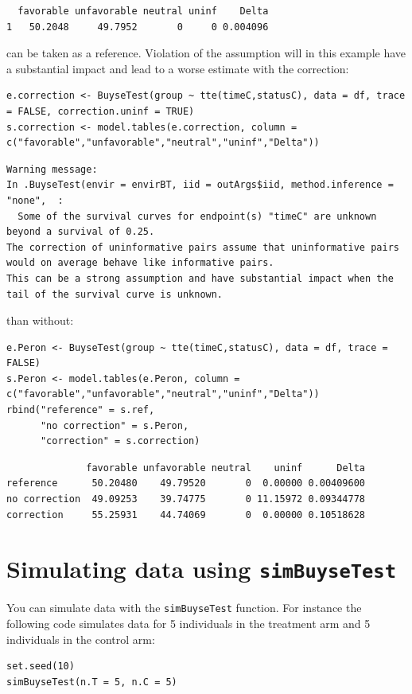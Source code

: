 \documentclass[12pt]{article}
\begin{document}
\begin{verbatim}
  favorable unfavorable neutral uninf    Delta
1   50.2048     49.7952       0     0 0.004096
\end{verbatim}


can be taken as a reference. Violation of the assumption will in this
example have a substantial impact and lead to a worse estimate with
the correction:
\lstset{language=r,label= ,caption= ,captionpos=b,numbers=none}
\begin{lstlisting}
e.correction <- BuyseTest(group ~ tte(timeC,statusC), data = df, trace = FALSE, correction.uninf = TRUE)
s.correction <- model.tables(e.correction, column = c("favorable","unfavorable","neutral","uninf","Delta"))
\end{lstlisting}

\begin{verbatim}
Warning message:
In .BuyseTest(envir = envirBT, iid = outArgs$iid, method.inference = "none",  :
  Some of the survival curves for endpoint(s) "timeC" are unknown beyond a survival of 0.25.
The correction of uninformative pairs assume that uninformative pairs would on average behave like informative pairs. 
This can be a strong assumption and have substantial impact when the tail of the survival curve is unknown.
\end{verbatim}


than without:
\lstset{language=r,label= ,caption= ,captionpos=b,numbers=none}
\begin{lstlisting}
e.Peron <- BuyseTest(group ~ tte(timeC,statusC), data = df, trace = FALSE)
s.Peron <- model.tables(e.Peron, column = c("favorable","unfavorable","neutral","uninf","Delta"))
rbind("reference" = s.ref,
      "no correction" = s.Peron,
      "correction" = s.correction)
\end{lstlisting}
\begin{verbatim}
              favorable unfavorable neutral    uninf      Delta
reference      50.20480    49.79520       0  0.00000 0.00409600
no correction  49.09253    39.74775       0 11.15972 0.09344778
correction     55.25931    44.74069       0  0.00000 0.10518628
\end{verbatim}


\clearpage

\section{Simulating data using \texttt{simBuyseTest}}
\label{sec:orgac68ddf}
You can simulate data with the \texttt{simBuyseTest} function. For instance
the following code simulates data for 5 individuals in the treatment
arm and 5 individuals in the control arm:
\lstset{language=r,label= ,caption= ,captionpos=b,numbers=none}
\begin{lstlisting}
set.seed(10)
simBuyseTest(n.T = 5, n.C = 5)
\end{lstlisting}
\end{document}
